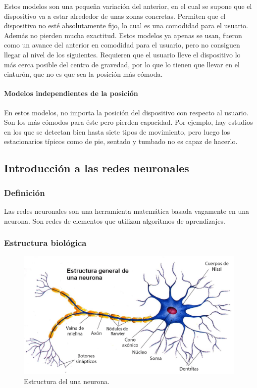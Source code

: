 \documentclass[12pt]{article}
\numberwithin{equation}{section}
\begin{document}
Estos modelos son una pequeña variación del anterior, en el cual se supone que el dispositivo va a estar alrededor de unas zonas concretas. Permiten que el dispositivo no esté absolutamente fijo, lo cual es una comodidad para el usuario. Además no pierden mucha exactitud. Estos modelos ya apenas se usan, fueron como un avance del anterior en comodidad para el usuario, pero no consiguen llegar al nivel de los siguientes. Requieren que el usuario lleve el dispositivo lo más cerca posible del centro de gravedad, por lo que lo tienen que llevar en el cinturón\cite{5673816}, que no es que sea la posición más cómoda.

\paragraph{Modelos independientes de la posición}

En estos modelos, no importa la posición del dispositivo con respecto al usuario. Son los más cómodos para éste pero pierden capacidad. Por ejemplo, hay estudios en los que se detectan bien hasta siete tipos de movimiento, pero luego los estacionarios típicos como de pie, sentado y tumbado no es capaz de hacerlo\cite{6488584}.%

\newpage
\subsection{Introducción a las redes neuronales}
\subsubsection{Definición}
Las redes neuronales son una herramienta matemática basada vagamente en una neurona. Son redes de elementos que utilizan algoritmos de aprendizajes.

\subsubsection{Estructura biológica}

\begin{figure}[h]
    \centering
    \includegraphics[width=1\textwidth]{estructura_general_neurona.png}
    \caption{Estructura del una neurona.}
    \label{fig:neuronareal}
\end{figure}
\end{document}
